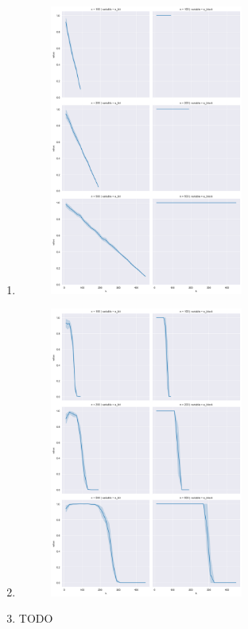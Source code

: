 \documentclass[12pt,letterpaper,boxed]{hmcpset}
\begin{document}
\begin{solution}
    \begin{enumerate}
        \item
	  \begin{figure}[H]
	    \centering
	    \includegraphics[width=0.6\textwidth]{figures/no-cleaning.png}
	  \end{figure}
        \item
	  \begin{figure}[H]
	    \centering
	    \includegraphics[width=0.6\textwidth]{figures/with-cleaning.png}
	  \end{figure}
	\item
	  TODO
    \end{enumerate}

\end{solution}
\end{document}
